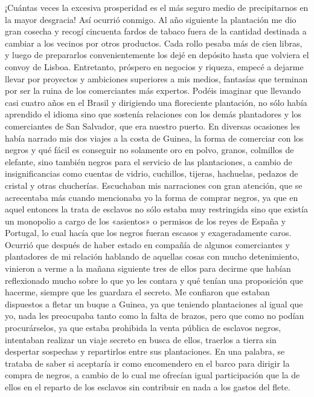 \documentclass{novela}
\begin{document}
    ¡Cuántas veces la excesiva prosperidad es el más seguro medio de precipitarnos en la mayor desgracia! Así ocurrió conmigo. Al año siguiente la plantación me dio gran cosecha y recogí cincuenta fardos de tabaco fuera de la cantidad destinada a cambiar a los vecinos por otros productos. Cada rollo pesaba más de cien libras, y luego de prepararlos convenientemente los dejé en depósito hasta que volviera el convoy de Lisboa. Entretanto, próspero en negocios y riqueza, empecé a dejarme llevar por proyectos y ambiciones superiores a mis medios, fantasías que terminan por ser la ruina de los comerciantes más expertos.
    Podéis imaginar que llevando casi cuatro años en el Brasil y dirigiendo una floreciente plantación, no sólo había aprendido el idioma sino que sostenía relaciones con los demás plantadores y los comerciantes de San Salvador, que era nuestro puerto. En diversas ocasiones les había narrado mis dos viajes a la costa de Guinea, la forma de comerciar con los negros y qué fácil es conseguir no solamente oro en polvo, granos, colmillos de elefante, sino también negros para el servicio de las plantaciones, a cambio de insignificancias como cuentas de vidrio, cuchillos, tijeras, hachuelas, pedazos de cristal y otras chucherías.
    Escuchaban mis narraciones con gran atención, que se acrecentaba más cuando mencionaba yo la forma de comprar negros, ya que en aquel entonces la trata de esclavos no sólo estaba muy restringida sino que existía un monopolio a cargo de los «asientos» o permisos de los reyes de España y Portugal, lo cual hacía que los negros fueran escasos y exageradamente caros.
    Ocurrió que después de haber estado en compañía de algunos comerciantes y plantadores de mi relación hablando de aquellas cosas con mucho detenimiento, vinieron a verme a la mañana siguiente tres de ellos para decirme que habían reflexionado mucho sobre lo que yo les contara y qué tenían una proposición que hacerme, siempre que les guardara el secreto. Me confiaron que estaban dispuestos a fletar un buque a Guinea, ya que teniendo plantaciones al igual que yo, nada les preocupaba tanto como la falta de brazos, pero que como no podían procurárselos, ya que estaba prohibida la venta pública de esclavos negros, intentaban realizar un viaje secreto en busca de ellos, traerlos a tierra sin despertar sospechas y repartirlos entre sus plantaciones. En una palabra, se trataba de saber si aceptaría ir como encomendero en el barco para dirigir la compra de negros, a cambio de lo cual me ofrecían igual participación que la de ellos en el reparto de los esclavos sin contribuir en nada a los gastos del flete.
\end{document}

